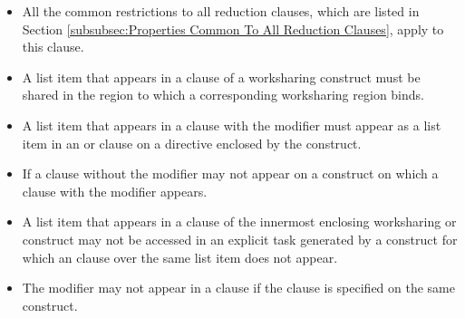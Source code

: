 \begin{itemize}
\item All the common restrictions to all reduction clauses, which are listed in
Section \ref{subsubsec:Properties Common To All Reduction Clauses}, apply to
this clause.

\item A list item that appears in a  clause of a worksharing
construct must be shared in the  region to which a corresponding
worksharing region binds.

\item A list item that appears in a  clause with
the  modifier must appear as a list item in an  or
 clause on a  directive enclosed by the
construct.

\item If a  clause without the  modifier may not
    appear on a construct on which a  clause with the
     modifier appears.

\item A list item that appears in a  clause of the innermost
enclosing worksharing or  construct may not be accessed in an
explicit task generated by a construct for which an  clause
over the same list item does not appear.

\item The  modifier may not appear in a  clause if
the  clause is specified on the same construct.

\end{itemize}

